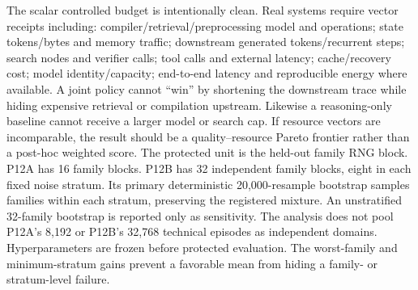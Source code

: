 \markdownRendererDocumentBegin
\markdownRendererSectionBegin
{}\markdownRendererInterblockSeparator
{}The scalar controlled budget is intentionally clean. Real systems require vector receipts including:\markdownRendererInterblockSeparator
{}\markdownRendererUlBeginTight
\markdownRendererUlItem compiler/retrieval/preprocessing model and operations;\markdownRendererUlItemEnd 
\markdownRendererUlItem state tokens/bytes and memory traffic;\markdownRendererUlItemEnd 
\markdownRendererUlItem downstream generated tokens/recurrent steps;\markdownRendererUlItemEnd 
\markdownRendererUlItem search nodes and verifier calls;\markdownRendererUlItemEnd 
\markdownRendererUlItem tool calls and external latency;\markdownRendererUlItemEnd 
\markdownRendererUlItem cache/recovery cost;\markdownRendererUlItemEnd 
\markdownRendererUlItem model identity/capacity;\markdownRendererUlItemEnd 
\markdownRendererUlItem end-to-end latency and reproducible energy where available.\markdownRendererUlItemEnd 
\markdownRendererUlEndTight \markdownRendererInterblockSeparator
{}A joint policy cannot “win” by shortening the downstream trace while hiding expensive retrieval or compilation upstream. Likewise a reasoning-only baseline cannot receive a larger model or search cap. If resource vectors are incomparable, the result should be a quality–resource Pareto frontier rather than a post-hoc weighted score.\markdownRendererInterblockSeparator
{}\markdownRendererSectionBegin
{}\markdownRendererInterblockSeparator
{}The protected unit is the held-out family RNG block. P12A has 16 family blocks. P12B has 32 independent family blocks, eight in each fixed noise stratum. Its primary deterministic 20,000-resample bootstrap samples families within each stratum, preserving the registered mixture. An unstratified 32-family bootstrap is reported only as sensitivity.\markdownRendererInterblockSeparator
{}The analysis does not pool P12A's 8,192 or P12B's 32,768 technical episodes as independent domains. Hyperparameters are frozen before protected evaluation. The worst-family and minimum-stratum gains prevent a favorable mean from hiding a family- or stratum-level failure.
\markdownRendererSectionEnd 
\markdownRendererSectionEnd \markdownRendererDocumentEnd